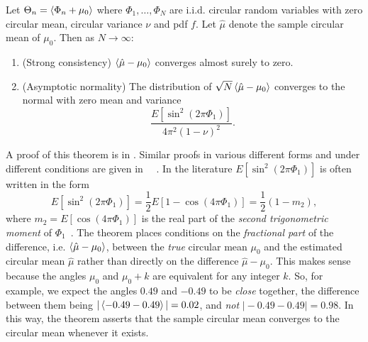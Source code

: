 \documentclass[journal]{IEEEtran}
\begin{document}
\begin{theorem}\label{thm:asymp_arg_complex_mean}
Let $\Theta_n = \left< \Phi_n + \mu_0 \right>$ where $\Phi_1, \dots, \Phi_N$ are i.i.d. circular random variables with zero circular mean, circular variance $\nu$ and pdf $f$. Let $\hat{\mu}$ denote the sample circular mean of $\mu_0$. Then as $N\rightarrow\infty$:
\begin{enumerate}
\item (Strong consistency) $\left< \hat{\mu} - \mu_0 \right>$ converges almost surely to zero.
\item (Asymptotic normality) The distribution of $\sqrt{N}\left< \hat{\mu} - \mu_0 \right>$ converges to the normal with zero mean and variance 
\begin{equation}\label{eq:asympvarscm}
\frac{E[\sin^2(2\pi\Phi_1)]}{4\pi^2(1 - \nu)^2}.
\end{equation}
\end{enumerate}
\end{theorem}
A proof of this theorem is in \cite[p.~88]{McKilliam2010thesis}. Similar proofs in various different forms and under different conditions are given in \cite{Quinn2009_dasp_phase_only_information_loss,Fisher_common_mean_direction_dir_est_no_dist_assumptions1983}~\cite[Chapter~4]{Jammalamadaka_dir_stat_book}~\cite[p.~111]{mardia_stat_dir_data_book_1975}. In the literature $E[\sin^2(2\pi\Phi_1)]$ is often written in the form
\[
E[\sin^2(2\pi\Phi_1)] = \frac{1}{2} E[ 1 - \cos(4\pi\Phi_1) ] = \frac{1}{2}(1 - m_2),
\]
where $m_2 = E[\cos(4\pi\Phi_1)]$ is the real part of the \emph{second trigonometric moment} of $\Phi_1$~\cite{Fisher_common_mean_direction_dir_est_no_dist_assumptions1983,Fisher1993,Bhattacharya_int_ext_means_2003}.  The theorem places conditions on the \emph{fractional part} of the difference, i.e. $\left< \hat{\mu} - \mu_0 \right>$, between the \emph{true} circular mean $\mu_0$ and the estimated circular mean $\hat{\mu}$ rather than directly on the difference $\hat{\mu} - \mu_0$.  This makes sense because the angles $\mu_0$ and $\mu_0 + k$ are equivalent for any integer $k$. So, for example, we expect the angles $0.49$ and $-0.49$ to be \emph{close} together, the difference between them being $\vert\left< -0.49 - 0.49 \right>\vert = 0.02$, and \emph{not} $\vert -0.49 - 0.49\vert = 0.98$. In this way, the theorem asserts that the sample circular mean converges to the circular mean whenever it exists. 

\end{document}
